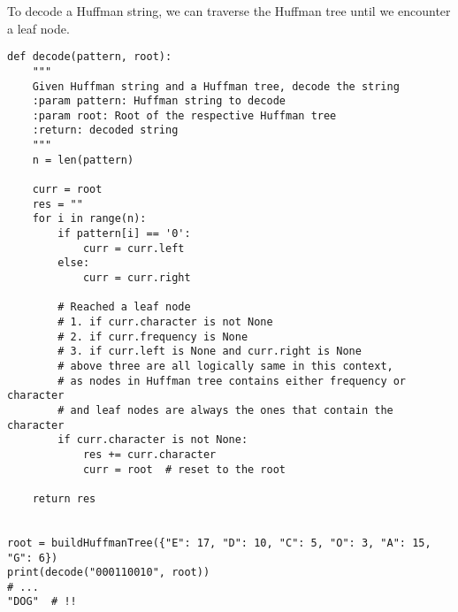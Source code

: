 \noindent [Bonus] To decode a Huffman string, we can traverse the Huffman tree until we encounter a leaf node.

\begin{verbatim}
def decode(pattern, root):
    """
    Given Huffman string and a Huffman tree, decode the string
    :param pattern: Huffman string to decode
    :param root: Root of the respective Huffman tree
    :return: decoded string
    """
    n = len(pattern)

    curr = root
    res = ""
    for i in range(n):
        if pattern[i] == '0':
            curr = curr.left
        else:
            curr = curr.right

        # Reached a leaf node
        # 1. if curr.character is not None
        # 2. if curr.frequency is None
        # 3. if curr.left is None and curr.right is None
        # above three are all logically same in this context,
        # as nodes in Huffman tree contains either frequency or character
        # and leaf nodes are always the ones that contain the character
        if curr.character is not None:
            res += curr.character
            curr = root  # reset to the root

    return res


root = buildHuffmanTree({"E": 17, "D": 10, "C": 5, "O": 3, "A": 15, "G": 6})
print(decode("000110010", root))
# ...
"DOG"  # !!
\end{verbatim}

